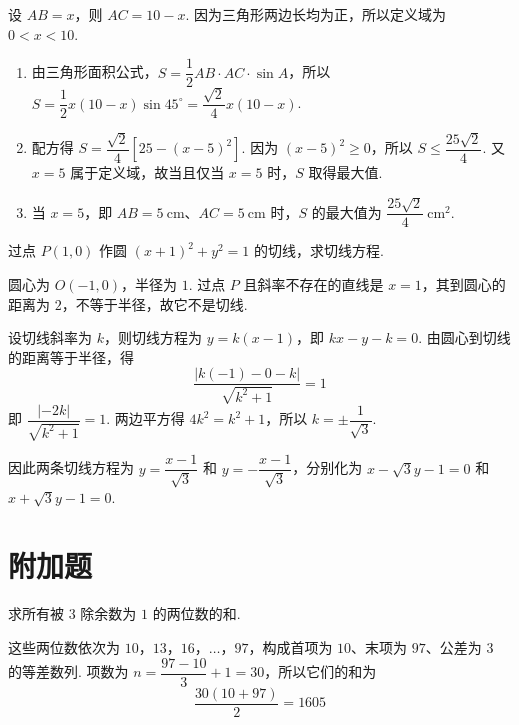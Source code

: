 \begin{solution}
设 \(AB=x\)，则 \(AC=10-x\). 因为三角形两边长均为正，所以定义域为 \(0<x<10\).
\begin{enumerate}
\item 由三角形面积公式，\(S=\dfrac12AB\cdot AC\cdot\sin A\)，所以 \(S=\dfrac12x(10-x)\sin45^\circ=\dfrac{\sqrt2}{4}x(10-x)\).

\item 配方得 \(S=\dfrac{\sqrt2}{4}\left[25-(x-5)^2\right]\). 因为 \((x-5)^2\geqslant0\)，所以 \(S\leqslant\dfrac{25\sqrt2}{4}\). 又 \(x=5\) 属于定义域，故当且仅当 \(x=5\) 时，\(S\) 取得最大值.

\item 当 \(x=5\)，即 \(AB=5\mathrm{~cm}\)、\(AC=5\mathrm{~cm}\) 时，\(S\) 的最大值为 \(\dfrac{25\sqrt2}{4}\mathrm{~cm}^2\).
\end{enumerate}
\end{solution}

\begin{problem}
过点 \(P\left(1,0\right)\) 作圆 \(\left(x+1\right)^2+y^2=1\) 的切线，求切线方程.
\end{problem}

\begin{solution}
圆心为 \(O\left(-1,0\right)\)，半径为 \(1\). 过点 \(P\) 且斜率不存在的直线是 \(x=1\)，其到圆心的距离为 \(2\)，不等于半径，故它不是切线.

设切线斜率为 \(k\)，则切线方程为 \(y=k(x-1)\)，即 \(kx-y-k=0\). 由圆心到切线的距离等于半径，得
\[
\frac{\left|k(-1)-0-k\right|}{\sqrt{k^2+1}}=1
\]
即 \(\dfrac{|-2k|}{\sqrt{k^2+1}}=1\). 两边平方得 \(4k^2=k^2+1\)，所以 \(k=\pm\dfrac1{\sqrt3}\).

因此两条切线方程为
\(y=\dfrac{x-1}{\sqrt3}\) 和 \(y=-\dfrac{x-1}{\sqrt3}\)，分别化为
\(x-\sqrt3y-1=0\) 和 \(x+\sqrt3y-1=0\).
\end{solution}

\section{附加题}

\begin{problem}
求所有被 \(3\) 除余数为 \(1\) 的两位数的和.
\end{problem}

\begin{solution}
这些两位数依次为 \(10\)，\(13\)，\(16\)，\(\ldots\)，\(97\)，构成首项为 \(10\)、末项为 \(97\)、公差为 \(3\) 的等差数列. 项数为
\(n=\dfrac{97-10}{3}+1=30\)，所以它们的和为
\[
\frac{30(10+97)}2=1605
\]
\end{solution}

